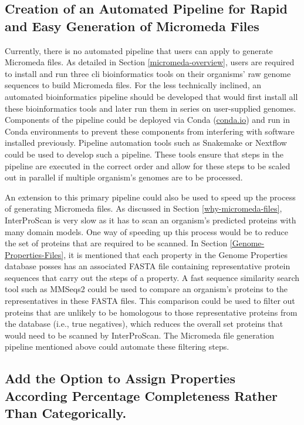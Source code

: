 \subsection{Creation of an Automated Pipeline for Rapid and Easy Generation of Micromeda Files} \label{pipeline-development}

Currently, there is no automated pipeline that users can apply to generate Micromeda files. As detailed in Section \ref{micromeda-overview}, users are required to install and run three \gls{cli} bioinformatics tools on their organisms' raw genome sequences to build Micromeda files. For the less technically inclined, an automated bioinformatics pipeline should be developed that would first install all these bioinformatics tools and later run them in series on user-supplied genomes. Components of the pipeline could be deployed via Conda (\href{conda.io}{conda.io}) and run in Conda environments to prevent these components from interfering with software installed previously. Pipeline automation tools such as Snakemake \cite{koster2012snakemake} or Nextflow \cite{di2017nextflow} could be used to develop such a pipeline. These tools ensure that steps in the pipeline are executed in the correct order and allow for these steps to be scaled out in parallel if multiple organism's genomes are to be processed.

An extension to this primary pipeline could also be used to speed up the process of generating Micromeda files. As discussed in Section \ref{why-micromeda-files}, InterProScan is very slow as it has to scan an organism's predicted proteins with many domain models. One way of speeding up this process would be to reduce the set of proteins that are required to be scanned. In Section \ref{Genome-Properties-Files}, it is mentioned that each property in the Genome Properties database posses has an associated FASTA file containing representative protein sequences that carry out the steps of a property. A fast sequence similarity search tool such as MMSeqs2 \cite{steinegger2017mmseqs2} could be used to compare an organism's proteins to the representatives in these FASTA files. This comparison could be used to filter out proteins that are unlikely to be homologous to those representative proteins from the database (i.e., true negatives), which reduces the overall set proteins that would need to be scanned by InterProScan. The Micromeda file generation pipeline mentioned above could automate these filtering steps.

\subsection{Add the Option to Assign Properties According Percentage Completeness Rather Than Categorically.}

